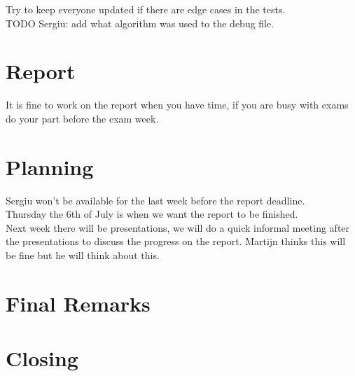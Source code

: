 \documentclass[a4paper,twoside,11pt]{article}
\begin{document}
\noindent Try to keep everyone updated if there are edge cases in the tests. \\
TODO Sergiu: add what algorithm was used to the debug file.\\

\section{Report}
It is fine to work on the report when you have time, if you are busy with exams do your part before the exam week. \\

\section{Planning}
Sergiu won't be available for the last week before the report deadline. \\
Thursday the 6th of July is when we want the report to be finished. \\
Next week there will be presentations, we will do a quick informal meeting after the presentations to discuss the progress on the report. Martijn thinks this will be fine but he will think about this.  

\section{Final Remarks}

\section{Closing}
\end{document}

